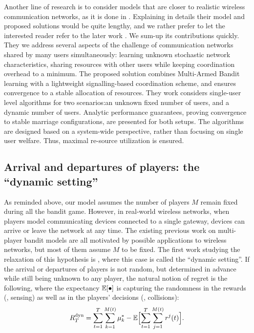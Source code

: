 Another line of research is to consider models that are closer to realistic wireless communication networks, as it is done in \cite{Avner16,AvnerMannor18}.
Explaining in details their model and proposed solutions would be quite lengthy, and we rather prefer to let the interested reader refer to the later work \cite{AvnerMannor18}.
We sum-up its contributions quickly.
They we address several aspects of the challenge of communication networks shared by many users simultaneously: learning unknown stochastic network characteristics, sharing resources with other users while keeping coordination overhead to a minimum.
The proposed solution combines Multi-Armed Bandit learning with a lightweight signalling-based coordination scheme, and ensures convergence to a stable allocation of resources.
They work considers single-user level algorithms for two scenarios:an unknown fixed number of users, and a dynamic number of users.
Analytic performance guarantees, proving convergence to stable marriage configurations, are presented for both setups. The algorithms are designed based on a system-wide perspective, rather than focusing on single user welfare. Thus, maximal re-source utilization is ensured.



\subsection{Arrival and departures of players: the ``dynamic setting''}
\label{sub:5:arrivalDepartures}

As reminded above, our model assumes the number of players $M$ remain fixed during all the bandit game.
However, in real-world wireless networks, when players model communicating devices connected to a single gateway, devices can arrive or leave the network at any time.
The existing previous work on multi-player bandit models are all motivated by possible applications to wireless networks, but most of them assume $M$ to be fixed.
The first work studying the relaxation of this hypothesis is \cite{Rosenski16}, where this case is called the ``dynamic setting''.
If the arrival or departures of players is not random, but determined in advance while still being unknown to any player, the natural notion of regret is the following, where the expectancy $\mathbb{E}[\bullet]$ is capturing the randomness in the rewards (\ie, sensing) as well as in the players' decisions (\ie, collisions):
\begin{equation}\label{eq:5:defRegretDynamicSetting}
    R_T^{\text{dyn}} = \sum_{t=1}^T \sum_{k=1}^{M(t)} \mu^*_{k} - \mathbb{E}\Bigl[ \sum_{t=1}^T \sum_{j=1}^{M(t)} r^j(t) \Bigr].
\end{equation}

